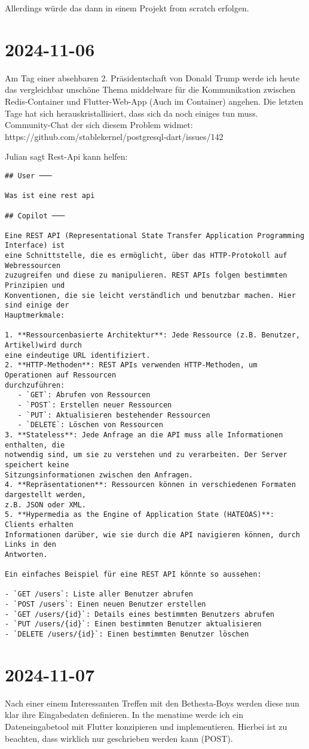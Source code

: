 \documentclass{article}
\begin{document}
Allerdings würde das dann in einem Projekt from scratch erfolgen.

\section{2024-11-06}%
\label{sec:2024-11-06}
Am Tag einer absehbaren 2. Präsidentschaft von Donald Trump werde ich heute das vergleichbar unschöne Thema middelware für die Kommunikation zwischen Redis-Container und Flutter-Web-App (Auch im Container) angehen.
Die letzten Tage hat sich herauskristallisiert, dass sich da noch einiges tun muss.
Community-Chat der sich diesem Problem widmet:
https://github.com/stablekernel/postgresql-dart/issues/142

Julian sagt Rest-Api kann helfen:


\begin{verbatim}
## User ───

Was ist eine rest api

## Copilot ───

Eine REST API (Representational State Transfer Application Programming Interface) ist 
eine Schnittstelle, die es ermöglicht, über das HTTP-Protokoll auf Webressourcen
zuzugreifen und diese zu manipulieren. REST APIs folgen bestimmten Prinzipien und
Konventionen, die sie leicht verständlich und benutzbar machen. Hier sind einige der
Hauptmerkmale:

1. **Ressourcenbasierte Architektur**: Jede Ressource (z.B. Benutzer, Artikel)wird durch
eine eindeutige URL identifiziert.
2. **HTTP-Methoden**: REST APIs verwenden HTTP-Methoden, um Operationen auf Ressourcen
durchzuführen:
   - `GET`: Abrufen von Ressourcen
   - `POST`: Erstellen neuer Ressourcen
   - `PUT`: Aktualisieren bestehender Ressourcen
   - `DELETE`: Löschen von Ressourcen
3. **Stateless**: Jede Anfrage an die API muss alle Informationen enthalten, die
notwendig sind, um sie zu verstehen und zu verarbeiten. Der Server speichert keine
Sitzungsinformationen zwischen den Anfragen.
4. **Repräsentationen**: Ressourcen können in verschiedenen Formaten dargestellt werden,
z.B. JSON oder XML.
5. **Hypermedia as the Engine of Application State (HATEOAS)**: Clients erhalten
Informationen darüber, wie sie durch die API navigieren können, durch Links in den
Antworten.

Ein einfaches Beispiel für eine REST API könnte so aussehen:

- `GET /users`: Liste aller Benutzer abrufen
- `POST /users`: Einen neuen Benutzer erstellen
- `GET /users/{id}`: Details eines bestimmten Benutzers abrufen
- `PUT /users/{id}`: Einen bestimmten Benutzer aktualisieren
- `DELETE /users/{id}`: Einen bestimmten Benutzer löschen
\end{verbatim}

\section{2024-11-07}%
\label{sec:2024-11-07}

Nach einer einem Interessanten Treffen mit den Bethesta-Boys werden diese nun klar ihre Eingabedaten definieren.
In the menatime werde ich ein Dateneingabetool mit Flutter konzipieren und implementieren.
Hierbei ist zu beachten, dass wirklich nur geschrieben werden kann (POST).
\end{document}
